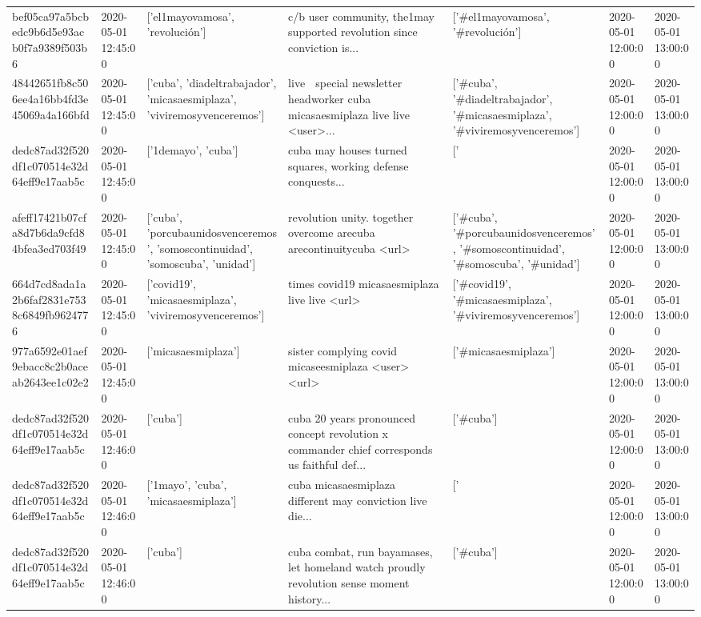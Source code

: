 \begin{tabular}{lllllll}
bef05ca97a5bcbedc9b6d5e93acb0f7a9389f503b6 & 2020-05-01 12:45:00 & ['el1mayovamosa', 'revolución'] & c/b user community, the1may supported revolution since conviction is... & ['#el1mayovamosa', '#revolución'] & 2020-05-01 12:00:00 & 2020-05-01 13:00:00 \\
48442651fb8c506ee4a16bb4fd3e45069a4a166bfd & 2020-05-01 12:45:00 & ['cuba', 'diadeltrabajador', 'micasaesmiplaza', 'viviremosyvenceremos'] & live 🔴 special newsletter headworker cuba micasaesmiplaza live live <user>... & ['#cuba', '#diadeltrabajador', '#micasaesmiplaza', '#viviremosyvenceremos'] & 2020-05-01 12:00:00 & 2020-05-01 13:00:00 \\
dedc87ad32f520df1c070514e32d64eff9e17aab5c & 2020-05-01 12:45:00 & ['1demayo', 'cuba'] & cuba may houses turned squares, working defense conquests... & ['#1demayo', '#cuba'] & 2020-05-01 12:00:00 & 2020-05-01 13:00:00 \\
afeff17421b07cfa8d7b6da9cfd84bfea3ed703f49 & 2020-05-01 12:45:00 & ['cuba', 'porcubaunidosvenceremos', 'somoscontinuidad', 'somoscuba', 'unidad'] & revolution unity. together overcome arecuba arecontinuitycuba <url> & ['#cuba', '#porcubaunidosvenceremos', '#somoscontinuidad', '#somoscuba', '#unidad'] & 2020-05-01 12:00:00 & 2020-05-01 13:00:00 \\
664d7cd8ada1a2b6faf2831e7538c6849fb9624776 & 2020-05-01 12:45:00 & ['covid19', 'micasaesmiplaza', 'viviremosyvenceremos'] & times covid19 micasaesmiplaza live live <url> & ['#covid19', '#micasaesmiplaza', '#viviremosyvenceremos'] & 2020-05-01 12:00:00 & 2020-05-01 13:00:00 \\
977a6592e01aef9ebacc8c2b0aceab2643ee1c02e2 & 2020-05-01 12:45:00 & ['micasaesmiplaza'] & sister complying covid micaseesmiplaza <user> <url> & ['#micasaesmiplaza'] & 2020-05-01 12:00:00 & 2020-05-01 13:00:00 \\
dedc87ad32f520df1c070514e32d64eff9e17aab5c & 2020-05-01 12:46:00 & ['cuba'] & cuba 20 years pronounced concept revolution x commander chief corresponds us faithful def... & ['#cuba'] & 2020-05-01 12:00:00 & 2020-05-01 13:00:00 \\
dedc87ad32f520df1c070514e32d64eff9e17aab5c & 2020-05-01 12:46:00 & ['1mayo', 'cuba', 'micasaesmiplaza'] & cuba micasaesmiplaza ️ 💪 different may conviction live die... & ['#1mayo', '#cuba', '#micasaesmiplaza'] & 2020-05-01 12:00:00 & 2020-05-01 13:00:00 \\
dedc87ad32f520df1c070514e32d64eff9e17aab5c & 2020-05-01 12:46:00 & ['cuba'] & cuba combat, run bayamases, let homeland watch proudly revolution sense moment history... & ['#cuba'] & 2020-05-01 12:00:00 & 2020-05-01 13:00:00 \\

\end{tabular}
